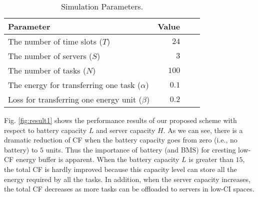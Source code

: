 \documentclass[conference, 10pt, ﬁnal, letterpaper, twocolumn]{IEEEtran}
\begin{document}
\begin{table}[h]
    \caption{\label{tab:parameters}Simulation Parameters.}
    \begin{center}
        \begin{threeparttable}[b]
            \begin{tabular}{*{2}{lr}}
                \toprule
                \midrule
                {\bf Parameter} & {\bf Value}\\
                \midrule
                 The number of time slots ($T$) & $24$ \\
                 The number of servers ($S$) & $3$\\
                 The number of tasks ($N$) & $100$\\
                 The energy for transferring one task ($\alpha$) & $0.1$\\
                 Loss for transferring one energy unit ($\beta$) & $0.2$\\
                \bottomrule
            \end{tabular}
        \end{threeparttable}
    \end{center}
\end{table}



Fig. \ref{fig:result1} shows the performance results of our proposed scheme with respect to battery capacity $L$ and server capacity $H$. As we can see, there is a dramatic reduction of CF when the battery capacity goes from zero (i.e., no battery) to $5$ units. Thus the importance of battery (and BMS) for cresting low-CF energy buffer is apparent. When the battery capacity $L$ is greater than $15$, the total CF is hardly improved because this capacity level can store all the energy required by all the tasks. In addition, when the server capacity increases, the total CF decreases as more tasks can be offloaded to servers in low-CI spaces.
\end{document}
